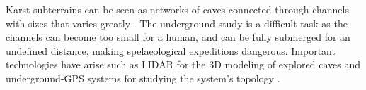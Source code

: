 Karst subterrains can be seen as networks of caves connected through channels with sizes that varies greatly \cite{Collon2017,Collon2021}. The underground study is a difficult task as the channels can become too small for a human, and can be fully submerged for an undefined distance, making spelaeological expeditions dangerous. Important technologies have arise such as LIDAR for the 3D modeling of explored caves and underground-GPS systems for studying the system's topology \cite{Collon2017}.



